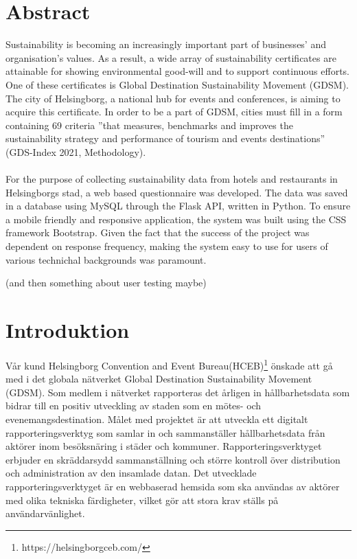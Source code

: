 \documentclass[12pt]{article}
\begin{document}
\section{Abstract}
Sustainability is becoming an increasingly important part of businesses’ and organisation’s values. As a result, a wide array of sustainability certificates are attainable for showing environmental good-will and to support continuous efforts. One of these certificates is Global Destination Sustainability Movement (GDSM). The city of Helsingborg, a national hub for events and conferences, is aiming to acquire this certificate. In order to be a part of GDSM, cities must fill in a form containing 69 criteria ”that measures, benchmarks and improves the sustainability strategy and performance of tourism and events destinations” (GDS-Index 2021, Methodology).\\\\
For the purpose of collecting sustainability data from hotels and restaurants in Helsingborgs stad, a web based questionnaire was developed. The data was saved in a database using MySQL through the Flask API, written in Python. To ensure a mobile friendly and responsive application, the system was built using the CSS framework Bootstrap. 
Given the fact that the success of the project was dependent on response frequency, making the system easy to use for users of various technichal backgrounds was paramount. 

(and then something about user testing maybe)

\newpage
\section{Introduktion}
Vår kund Helsingborg Convention and Event Bureau(HCEB)\footnote{https://helsingborgceb.com/} önskade att gå med i det globala nätverket Global Destination Sustainability Movement (GDSM). Som medlem i nätverket rapporteras det årligen in hållbarhetsdata som bidrar till en positiv utveckling av staden som en mötes- och evenemangsdestination. Målet med projektet är att utveckla ett digitalt rapporteringsverktyg som samlar in och sammanställer hållbarhetsdata från aktörer inom besöksnäring i städer och kommuner. Rapporteringsverktyget erbjuder en skräddarsydd sammanställning och större kontroll över distribution och administration av den insamlade datan. Det utvecklade rapporteringsverktyget är en webbaserad hemsida som ska användas av aktörer med olika tekniska färdigheter, vilket gör att stora krav ställs på användarvänlighet.
\end{document}
